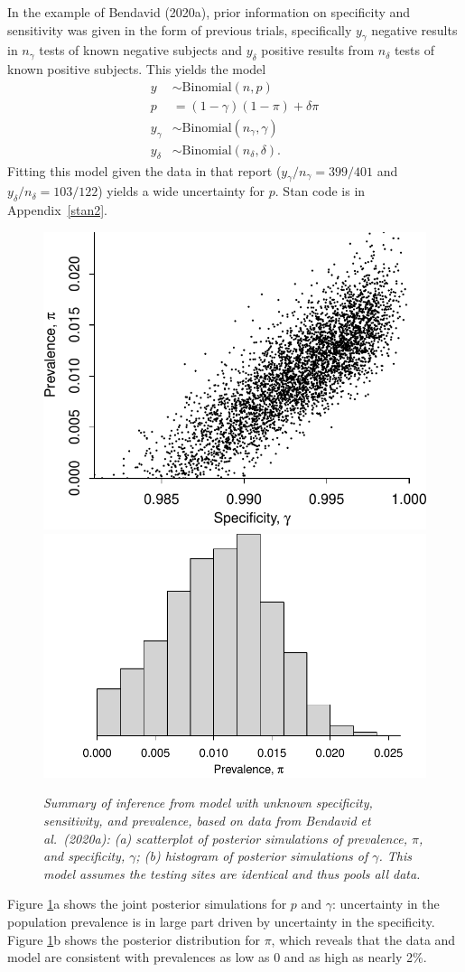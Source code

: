 \documentclass[11pt]{article}
\begin{document}
In the example of Bendavid (2020a), prior information on specificity and sensitivity was given in the form of previous trials, specifically $y_{\gamma}$ negative results in $n_{\gamma}$ tests of known negative subjects and $y_{\delta}$ positive results from $n_{\delta}$ tests of known positive subjects.  This yields the model
  \begin{align*}
   y & \sim \mbox{Binomial} (n, p)\\
  p & = (1-\gamma)(1- \pi)+ \delta\pi\\
   y_{\gamma} & \sim \mbox{Binomial} (n_{\gamma}, \gamma)\\
   y_{\delta} & \sim \mbox{Binomial} (n_{\delta}, \delta).
 \end{align*}
 Fitting this model given the data in that report ($y_{\gamma}/n_{\gamma}=399/401$ and $y_{\delta}/n_{\delta}=103/122$) yields a wide uncertainty for $p$.  Stan code is in Appendix~\ref{stan2}.

\begin{figure}
\centerline{ \includegraphics[width=.45\textwidth]{scatter.pdf} \includegraphics[width=.55\textwidth]{hist.pdf}}
\caption{\em Summary of inference from model with unknown specificity, sensitivity, and prevalence, based on data from Bendavid et al.\ (2020a):  (a) scatterplot of posterior simulations of prevalence, $\pi$, and specificity, $\gamma$; (b) histogram of posterior simulations of $\gamma$.  This model assumes the testing sites are identical and thus pools all data.}
\label{posterior1}
\end{figure}

Figure \ref{posterior1}a shows the joint posterior simulations for $p$ and $\gamma$:  uncertainty in the population prevalence is in large part driven by uncertainty in the specificity.  Figure \ref{posterior1}b shows the posterior distribution for $\pi$, which reveals that the data and model are consistent with prevalences as low as 0 and as high as nearly 2\%.
\end{document}
